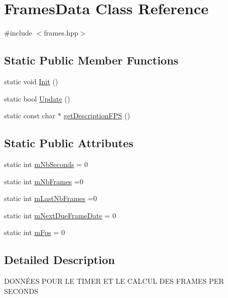 \hypertarget{class_frames_data}{\section{Frames\+Data Class Reference}
\label{class_frames_data}
}


{\ttfamily \#include $<$frames.\+hpp$>$}

\subsection*{Static Public Member Functions}
\begin{DoxyCompactItemize}
\item 
static void \hyperlink{class_frames_data_adb376443cd35cdf789334e5216799632}{Init} ()
\item 
static bool \hyperlink{class_frames_data_a0a13292d2ffde616533d2185de424af1}{Update} ()
\item 
static const char $\ast$ \hyperlink{class_frames_data_a2e4c0df27e34dd492dae0b3c674838aa}{get\+Description\+F\+P\+S} ()
\end{DoxyCompactItemize}
\subsection*{Static Public Attributes}
\begin{DoxyCompactItemize}
\item 
static int \hyperlink{class_frames_data_a56de1cc7ef9d170fe22887138d8addbf}{m\+Nb\+Seconds} = 0
\item 
static int \hyperlink{class_frames_data_a10cfddde5c0b9b229af867f2ed7af153}{m\+Nb\+Frames} =0
\item 
static int \hyperlink{class_frames_data_ad0b7497c5a449779d7dd01de39f592d0}{m\+Last\+Nb\+Frames} =0
\item 
static int \hyperlink{class_frames_data_ac0c60108ce1672499d5d69d9c8ea9111}{m\+Next\+Due\+Frame\+Date} = 0
\item 
static int \hyperlink{class_frames_data_a6a6d7c603d09b1ba203e72a82d499eae}{m\+Fps} = 0
\end{DoxyCompactItemize}


\subsection{Detailed Description}
D\+O\+N\+NÉ\+E\+S P\+O\+U\+R L\+E T\+I\+M\+E\+R E\+T L\+E C\+A\+L\+C\+U\+L D\+E\+S F\+R\+A\+M\+E\+S P\+E\+R S\+E\+C\+O\+N\+D\+S 

